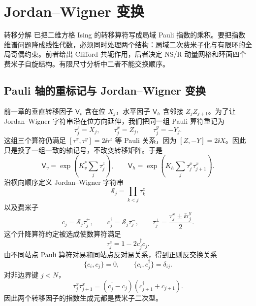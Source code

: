 \section{Jordan--Wigner 变换}
\label{chap:phys-sm-clifford-jw-finite-sectors}

转移分解  已把二维方格 Ising 的转移算符写成局域 Pauli 指数的乘积。要把指数维谱问题降成线性代数，必须同时处理两个结构：局域二次费米子化与有限环的全局奇偶约束。前者给出 Clifford 共轭作用，后者决定 NS/R 动量网格和环面四个费米子自旋结构。有限尺寸分析中二者不能交换顺序。
\subsection{Pauli 轴的重标记与 Jordan--Wigner 变换}
\label{sec:phys-sm-jw-majorana}

前一章的垂直转移因子 $\mathsf V_v$ 含在位 $X_j$，水平因子 $\mathsf V_h$ 含邻接 $Z_jZ_{j+1}$。为了让 Jordan--Wigner 字符串沿在位方向延伸，我们把同一组 Pauli 算符重记为
\begin{equation}
 \tau_j^z=X_j,
 \qquad
 \tau_j^x=Z_j,
 \qquad
 \tau_j^y=-Y_j.
 \label{eq:phys-sm-pauli-axis-rotation}
\end{equation}
这组三个算符仍满足 $[\tau^x,\tau^y]=2\ii\tau^z$ 等 Pauli 关系，因为 $[Z,-Y]=2\ii X$。因此只是换了一组一致的轴记号，不改变转移矩阵。于是
\[
 \mathsf V_v=\exp\!\left(K_v^*\sum_j\tau_j^z\right),
 \qquad
 \mathsf V_h=\exp\!\left(K_h\sum_j\tau_j^x\tau_{j+1}^x\right).
\]
沿横向顺序定义 Jordan--Wigner 字符串
\[
 \mathscr S_j=\prod_{k<j}\tau_k^z
\]
以及费米子
\begin{equation}
 c_j=\mathscr S_j\tau_j^+,
 \qquad
 c_j^\dagger=\mathscr S_j\tau_j^-,
 \qquad
 \tau_j^\pm=\frac{\tau_j^x\pm\ii\tau_j^y}{2}.
 \label{eq:phys-sm-jordan-wigner}
\end{equation}
这个升降算符约定被选成使数算符满足
\begin{equation}
 \tau_j^z=1-2c_j^\dagger c_j.
 \label{eq:phys-sm-tauz-number}
\end{equation}
由不同站点 Pauli 算符对易和同站点反对易关系，得到正则反交换关系
\begin{equation}
 \{c_i,c_j\}=0,
 \qquad
 \{c_i,c_j^\dagger\}=\delta_{ij}.
 \label{eq:phys-sm-jw-car}
\end{equation}
对非边界键 \(j<N\)，
\begin{equation}
 \tau_j^x\tau_{j+1}^x
 =(c_j^\dagger-c_j)(c_{j+1}^\dagger+c_{j+1}).
 \label{eq:phys-sm-neighbor-jw}
\end{equation}
因此两个转移因子的指数生成元都是费米子二次型。

